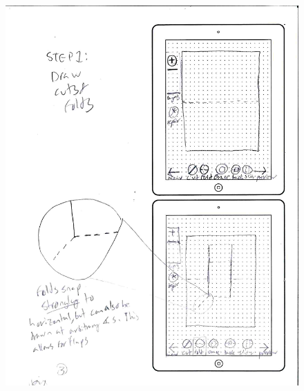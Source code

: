 \begin{figure}[htbp]
\centering
\includegraphics{figures/90_Appendix_UI_Mockups/002.png}
\caption{}
\end{figure}

